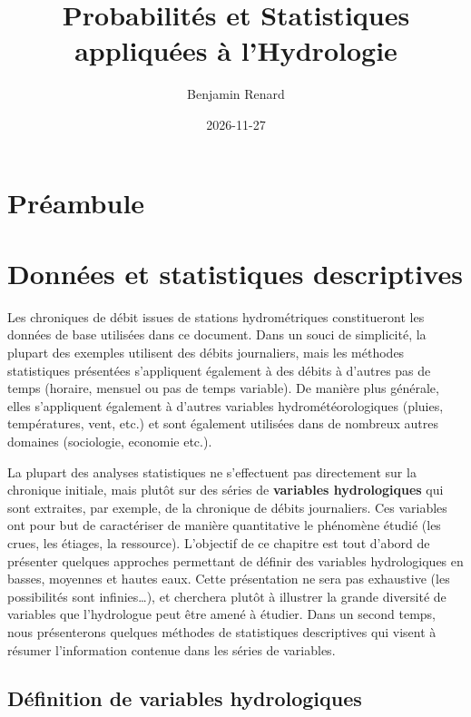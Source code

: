 \documentclass[
]{book}
\title{Probabilités et Statistiques appliquées à l'Hydrologie}
\author{Benjamin Renard}
\date{2026-11-27}
\begin{document}
\maketitle

{
\setcounter{tocdepth}{1}
\tableofcontents
}
\chapter*{Préambule}\label{pruxe9ambule}

\chapter{Données et statistiques descriptives}\label{donnuxe9es-et-statistiques-descriptives}

Les chroniques de débit issues de stations hydrométriques constitueront les données de base utilisées dans ce document. Dans un souci de simplicité, la plupart des exemples utilisent des débits journaliers, mais les méthodes statistiques présentées s'appliquent également à des débits à d'autres pas de temps (horaire, mensuel ou pas de temps variable). De manière plus générale, elles s'appliquent également à d'autres variables hydrométéorologiques (pluies, températures, vent, etc.) et sont également utilisées dans de nombreux autres domaines (sociologie, economie etc.).

La plupart des analyses statistiques ne s'effectuent pas directement sur la chronique initiale, mais plutôt sur des séries de \textbf{variables hydrologiques} qui sont extraites, par exemple, de la chronique de débits journaliers. Ces variables ont pour but de caractériser de manière quantitative le phénomène étudié (les crues, les étiages, la ressource). L'objectif de ce chapitre est tout d'abord de présenter quelques approches permettant de définir des variables hydrologiques en basses, moyennes et hautes eaux. Cette présentation ne sera pas exhaustive (les possibilités sont infinies\ldots), et cherchera plutôt à illustrer la grande diversité de variables que l'hydrologue peut être amené à étudier. Dans un second temps, nous présenterons quelques méthodes de statistiques descriptives qui visent à résumer l'information contenue dans les séries de variables.

\section{Définition de variables hydrologiques}\label{duxe9finition-de-variables-hydrologiques}
\end{document}
